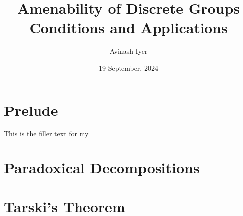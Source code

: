 \documentclass[10pt]{package2}
\title{Amenability of Discrete Groups\\ {\large Conditions and Applications}}
\author{Avinash Iyer}
\date{19 September, 2024}
\begin{document}
\maketitle
\tableofcontents
\chapter{Prelude}
This is the filler text for my 
\chapter{Paradoxical Decompositions}
\chapter{Tarski's Theorem}
\end{document}
